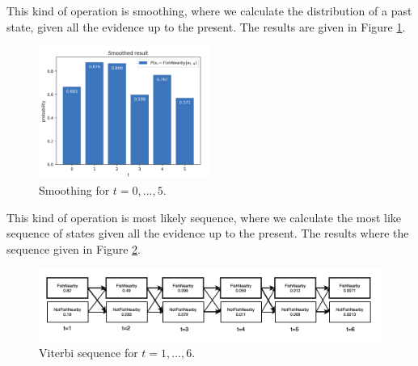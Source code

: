 \documentclass[11pt, a4paper, english]{NTNUoving}
\begin{document}
\begin{oppgave}
\begin{punkt}
    This kind of operation is smoothing, where we calculate the distribution of a past state, given all the evidence up to the present.
    The results are given in Figure \ref{fig:smoothing}.

    \begin{figure}[H]
        \centering
        \includegraphics[width=0.5\textwidth]{smoothing.png}
        \caption{Smoothing for $t = 0,...,5$.}
        \label{fig:smoothing}
    \end{figure}
\end{punkt}

\begin{punkt}
    This kind of operation is most likely sequence, where we calculate the most like sequence of states given all the evidence up to the present.
    The results where the sequence given in Figure \ref{fig:viterbi}.

    \begin{figure}[H]
        \centering
        \includegraphics[width=1.0\textwidth]{viterbi.png}
        \caption{Viterbi sequence for $t = 1,...,6$.}
        \label{fig:viterbi}
    \end{figure}
\end{punkt}

\end{oppgave}

\end{document}
